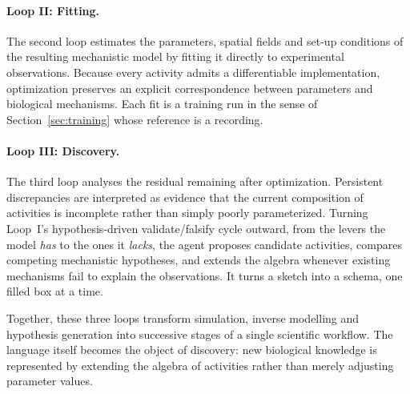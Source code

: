 \documentclass[11pt]{article}
\begin{document}
\paragraph{Loop II: Fitting.}

The second loop estimates the parameters, spatial fields and set-up conditions of the
resulting mechanistic model by fitting it directly to experimental observations.
Because every activity admits a differentiable implementation, optimization preserves
an explicit correspondence between parameters and biological mechanisms. Each fit is
a training run in the sense of Section~\ref{sec:training} whose reference is a
recording.

\paragraph{Loop III: Discovery.}

The third loop analyses the residual remaining after optimization. Persistent
discrepancies are interpreted as evidence that the current composition of activities
is incomplete rather than simply poorly parameterized. Turning Loop~I's
hypothesis-driven validate/falsify cycle outward, from the levers the model \emph{has}
to the ones it \emph{lacks}, the agent proposes candidate activities, compares
competing mechanistic hypotheses, and extends the algebra whenever existing mechanisms
fail to explain the observations. It turns a sketch into a schema, one filled box at a
time.

Together, these three loops transform simulation, inverse modelling and hypothesis
generation into successive stages of a single scientific workflow. The language itself
becomes the object of discovery: new biological knowledge is represented by extending
the algebra of activities rather than merely adjusting parameter values.
\end{document}
